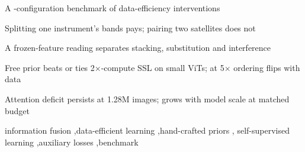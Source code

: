 \documentclass[a4paper,fleqn]{cas-dc}
\newif\ifsubmissionmode
\begin{document}
\ifsubmissionmode\else
\begin{highlights}
\item A \computeCells-configuration benchmark of data-efficiency interventions
\item Splitting one instrument's bands pays; pairing two satellites does not
\item A frozen-feature reading separates stacking, substitution and interference
\item Free prior beats or ties 2$\times$-compute SSL on small ViTs; at 5$\times$ ordering flips with data
\item Attention deficit persists at 1.28M images; grows with model scale at matched budget
\end{highlights}
\fi

\begin{keywords}
information fusion \sep data-efficient learning \sep hand-crafted priors \sep
self-supervised learning \sep auxiliary losses \sep benchmark
\end{keywords}

\maketitle
\sloppy  %
\end{document}
